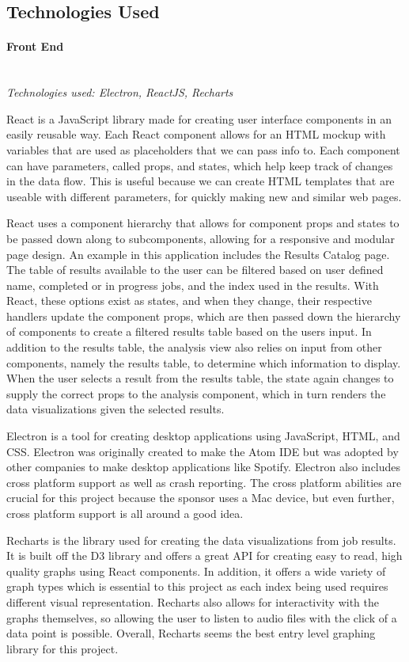 \subsection{Technologies Used}

\paragraph{Front End} \mbox{} \\
\textit{Technologies used: Electron, ReactJS, Recharts}\par
React is a JavaScript library made for creating user interface components in an easily reusable way. Each React component allows for an HTML mockup with variables that are used as placeholders that we can pass info to. Each component can have parameters, called props, and states, which help keep track of changes in the data flow. This is useful because we can create HTML templates that are useable with different parameters, for quickly making new and similar web pages.\par
React uses a component hierarchy that allows for component props and states to be passed down along to subcomponents, allowing for a responsive and modular page design. An example in this application includes the Results Catalog page. The table of results available to the user can be filtered based on user defined name, completed or in progress jobs, and the index used in the results. With React, these options exist as states, and when they change, their respective handlers update the component props, which are then passed down the hierarchy of components to create a filtered results table based on the user\textquotesingle s input. In addition to the results table, the analysis view also relies on input from other components, namely the results table, to determine which information to display. When the user selects a result from the results table, the state again changes to supply the correct props to the analysis component, which in turn renders the data visualizations given the selected results.\par
Electron is a tool for creating desktop applications using JavaScript, HTML, and CSS. Electron was originally created to make the Atom IDE but was adopted by other companies to make desktop applications like Spotify. Electron also includes cross platform support as well as crash reporting. The cross platform abilities are crucial for this project because the sponsor uses a Mac device, but even further, cross platform support is all around a good idea.\par
Recharts is the library used for creating the data visualizations from job results. It is built off the D3 library and offers a great API for creating easy to read, high quality graphs using React components. In addition, it offers a wide variety of graph types which is essential to this project as each index being used requires different visual representation. Recharts also allows for interactivity with the graphs themselves, so allowing the user to listen to audio files with the click of a data point is possible. Overall, Recharts seems the best entry level graphing library for this project.\par

